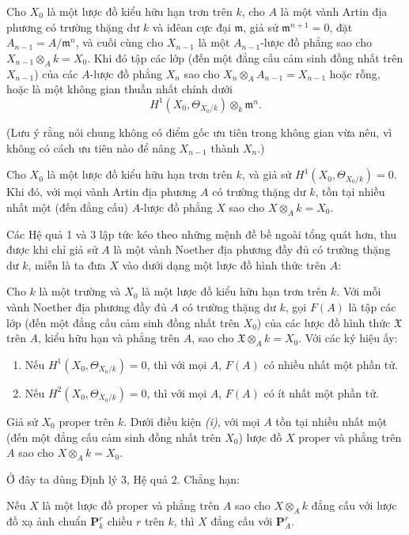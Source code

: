  Cho $X_0$ là một lược đồ kiểu hữu hạn trơn trên $k$, cho
$A$ là một vành Artin địa phương có trường thặng dư $k$ và iđêan cực đại
$\mathfrak m$, giả sử $\mathfrak m^{n+1}=0$, đặt
$A_{n-1}=A/\mathfrak m^n$, và cuối cùng cho $X_{n-1}$ là một
$A_{n-1}$-lược đồ phẳng sao cho $X_{n-1}\otimes_A k=X_0$. Khi đó tập các
lớp (đến một đẳng cấu cảm sinh đồng nhất trên $X_{n-1}$) của các $A$-lược đồ
phẳng $X_n$ sao cho $X_n\otimes_A A_{n-1}=X_{n-1}$ hoặc rỗng, hoặc là một
không gian thuần nhất chính dưới
\[
  H^1(X_0,\Theta_{X_0/k})\otimes_k\mathfrak m^n.
\]

(Lưu ý rằng nói chung không có điểm gốc ưu tiên trong không gian vừa nêu, vì
không có cách ưu tiên nào để nâng $X_{n-1}$ thành $X_n$.)

 Cho $X_0$ là một lược đồ kiểu hữu hạn trơn trên $k$, và
giả sử $H^1(X_0,\Theta_{X_0/k})=0$. Khi đó, với mọi vành Artin địa phương
$A$ có trường thặng dư $k$, tồn tại nhiều nhất một (đến đẳng cấu) $A$-lược đồ
phẳng $X$ sao cho $X\otimes_A k=X_0$.

Các Hệ quả 1 và 3 lập tức kéo theo những mệnh đề bề ngoài tổng quát hơn, thu
được khi chỉ giả sử $A$ là một vành Noether địa phương đầy đủ có trường thặng
dư $k$, miễn là ta đưa $X$ vào dưới dạng một lược đồ hình thức trên $A$:

 Cho $k$ là một trường và $X_0$ là một lược đồ kiểu hữu
hạn trơn trên $k$. Với mỗi vành Noether địa phương đầy đủ $A$ có trường thặng
dư $k$, gọi $F(A)$ là tập các lớp (đến một đẳng cấu cảm sinh đồng nhất trên
$X_0$) của các lược đồ hình thức $\mathfrak X$ trên $A$, kiểu hữu hạn và phẳng
trên $A$, sao cho $\mathfrak X\otimes_A k=X_0$. Với các ký hiệu ấy:
\begin{enumerate}
  \item[\textit{i.}] Nếu $H^1(X_0,\Theta_{X_0/k})=0$, thì với mọi $A$,
    $F(A)$ có nhiều nhất một phần tử.
  \item[\textit{ii.}] Nếu $H^2(X_0,\Theta_{X_0/k})=0$, thì với mọi $A$,
    $F(A)$ có ít nhất một phần tử.
\end{enumerate}

 Giả sử $X_0$ proper trên $k$. Dưới điều kiện
\textit{(i)}, với mọi $A$ tồn tại nhiều nhất một (đến một đẳng cấu cảm sinh
đồng nhất trên $X_0$) lược đồ $X$ proper và phẳng trên $A$ sao cho
$X\otimes_A k=X_0$.

Ở đây ta dùng Định lý 3, Hệ quả 2. Chẳng hạn:

 Nếu $X$ là một lược đồ proper và phẳng trên $A$ sao cho
$X\otimes_A k$ đẳng cấu với lược đồ xạ ảnh chuẩn $\mathbf P_k^r$ chiều $r$
trên $k$, thì $X$ đẳng cấu với $\mathbf P_A^r$.

